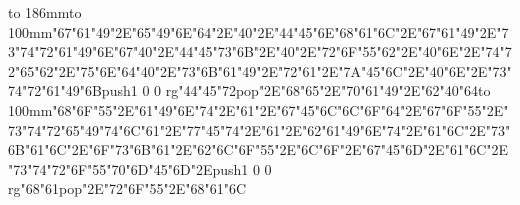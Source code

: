 \hbox to 186mm{\hsize=81mm\vbox to 100mm{\vfill\ipa\char"67\ipa\char"61\ipa\char"49\ipa\char"2E\ipa\char"65\ipa\char"49\ipa\char"6E\ipa\char"64\ipa\char"2E\ipa\char"40\ipa\char"2E\ipa\char"44\ipa\char"45\ipa\char"6E\medskip\ipa\char"68\ipa\char"61\ipa\char"6C\ipa\char"2E\ipa\char"67\ipa\char"61\ipa\char"49\ipa\char"2E\ipa\char"73\ipa\char"74\ipa\char"72\ipa\char"61\ipa\char"49\ipa\char"6E\medskip\ipa\char"67\ipa\char"40\ipa\char"2E\ipa\char"44\ipa\char"45\ipa\char"73\ipa\char"6B\ipa\char"2E\ipa\char"40\ipa\char"2E\ipa\char"72\ipa\char"6F\ipa\char"55\ipa\char"62\ipa\char"2E\ipa\char"40\ipa\char"6E\ipa\char"2E\ipa\char"74\ipa\char"72\ipa\char"65\ipa\char"62\ipa\char"2E\ipa\char"75\ipa\char"6E\ipa\char"64\medskip\ipa\char"40\ipa\char"2E\ipa\char"73\ipa\char"6B\ipa\char"61\ipa\char"49\ipa\char"2E\ipa\char"72\ipa\char"61\ipa\char"2E\ipa\char"7A\ipa\char"45\ipa\char"6C\ipa\char"2E\ipa\char"40\ipa\char"6E\ipa\char"2E\ipa\char"73\ipa\char"74\ipa\char"72\ipa\char"61\ipa\char"49\ipa\char"6B\medskip\pdfcolorstack\match push{1 0 0 rg}\ipa\char"44\ipa\char"45\ipa\char"72\pdfcolorstack\match pop{}\ipa\char"2E\ipa\char"68\ipa\char"65\ipa\char"2E\ipa\char"70\ipa\char"61\ipa\char"49\ipa\char"2E\ipa\char"62\ipa\char"40\ipa\char"64\vfill}\hfill\vbox to 100mm{\vfill\ipa\char"68\ipa\char"6F\ipa\char"55\ipa\char"2E\ipa\char"61\ipa\char"49\ipa\char"6E\ipa\char"74\ipa\char"2E\ipa\char"61\ipa\char"2E\ipa\char"67\ipa\char"45\ipa\char"6C\medskip\ipa\char"6C\ipa\char"6F\ipa\char"64\ipa\char"2E\ipa\char"67\ipa\char"6F\ipa\char"55\ipa\char"2E\ipa\char"73\ipa\char"74\ipa\char"72\ipa\char"65\ipa\char"49\ipa\char"74\medskip\ipa\char"6C\ipa\char"61\ipa\char"2E\ipa\char"77\ipa\char"45\ipa\char"74\ipa\char"2E\ipa\char"61\ipa\char"2E\ipa\char"62\ipa\char"61\ipa\char"49\ipa\char"6E\ipa\char"74\ipa\char"2E\ipa\char"61\ipa\char"6C\ipa\char"2E\ipa\char"73\ipa\char"6B\ipa\char"61\ipa\char"6C\ipa\char"2E\ipa\char"6F\ipa\char"73\ipa\char"6B\medskip\ipa\char"61\ipa\char"2E\ipa\char"62\ipa\char"6C\ipa\char"6F\ipa\char"55\ipa\char"2E\ipa\char"6C\ipa\char"6F\ipa\char"2E\ipa\char"67\ipa\char"45\ipa\char"6D\ipa\char"2E\ipa\char"61\ipa\char"6C\ipa\char"2E\ipa\char"73\ipa\char"74\ipa\char"72\ipa\char"6F\ipa\char"55\ipa\char"70\medskip\ipa\char"6D\ipa\char"45\ipa\char"6D\ipa\char"2E\pdfcolorstack\match push{1 0 0 rg}\ipa\char"68\ipa\char"61\pdfcolorstack\match pop{}\ipa\char"2E\ipa\char"72\ipa\char"6F\ipa\char"55\ipa\char"2E\ipa\char"68\ipa\char"61\ipa\char"6C\vfill}}\eject
